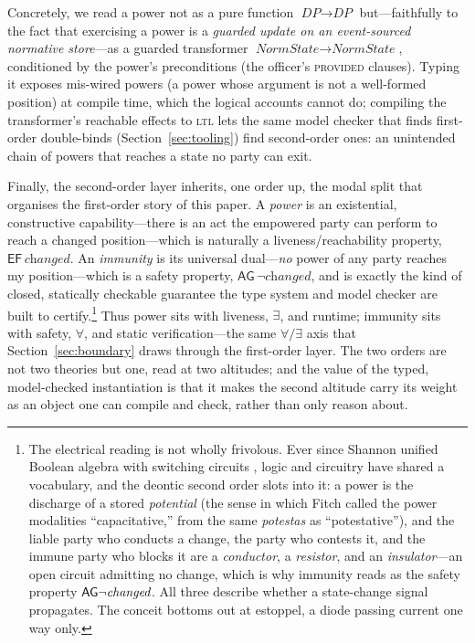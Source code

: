 Concretely, we read a power not as a pure function $\textit{DP}\to\textit{DP}$
but---faithfully to the fact that exercising a power is a \emph{guarded update on
an event-sourced normative store}---as a guarded transformer
$\textit{NormState}\to\textit{NormState}$, conditioned by the power's
preconditions (the officer's \textsc{provided} clauses). Typing it exposes
mis-wired powers (a power whose argument is not a well-formed position) at
compile time, which the logical accounts cannot do; compiling the transformer's
reachable effects to \textsc{ltl} lets the same model checker that finds
first-order double-binds (Section~\ref{sec:tooling}) find second-order ones:
an unintended chain of powers that reaches a state no party can exit.

Finally, the second-order layer inherits, one order up, the modal split that
organises the first-order story of this paper. A \emph{power} is an existential,
constructive capability---there is an act the empowered party can perform to reach
a changed position---which is naturally a liveness/reachability property,
$\mathsf{EF}\,\textit{changed}$. An \emph{immunity} is its universal dual---\emph{no}
power of any party reaches my position---which is a safety property,
$\mathsf{AG}\,\lnot\textit{changed}$, and is exactly the kind of closed,
statically checkable guarantee the type system and model checker are built to
certify.\footnote{The electrical reading is not wholly frivolous. Ever since Shannon
unified Boolean algebra with switching circuits , logic and
circuitry have shared a vocabulary, and the deontic second order slots into it: a
power is the discharge of a stored \emph{potential} (the sense in which Fitch called
the power modalities ``capacitative,'' from the same \emph{potestas} as
``potestative''), and the liable party who conducts a change, the party who contests
it, and the immune party who blocks it are a \emph{conductor}, a \emph{resistor}, and
an \emph{insulator}---an open circuit admitting no change, which is why immunity reads
as the safety property $\mathsf{AG}\lnot\textit{changed}$. All three describe whether a
state-change signal propagates. The conceit bottoms out at estoppel, a diode passing
current one way only.} Thus power sits with liveness, $\exists$, and runtime; immunity sits with
safety, $\forall$, and static verification---the same $\forall/\exists$ axis that
Section~\ref{sec:boundary} draws through the first-order layer. The two orders are
not two theories but one, read at two altitudes; and the value of the typed,
model-checked instantiation is that it makes the second altitude carry its weight
as an object one can compile and check, rather than only reason about.

